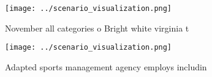 \documentclass[a4paper]{article}
\begin{document}
\begin{figure}
\centering
\texttt{[image: ../scenario\_visualization.png]}
\caption{November all categories o Bright white virginia t
}
\end{figure}
 
\begin{figure}
\centering
\texttt{[image: ../scenario\_visualization.png]}
\caption{Adapted sports management agency employs includin
}
\end{figure}
 
\end{document}
